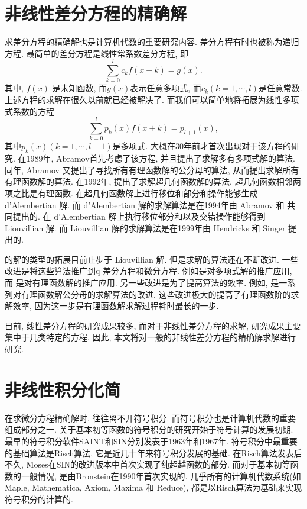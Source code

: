 \section{非线性差分方程的精确解}
求差分方程的精确解也是计算机代数的重要研究内容. 差分方程有时也被称为递归方程. 最简单的差分方程是线性常系数差分方程, 即
\begin{equation}
\sum_{k=0}^l{c_k f(x+k)}=g(x).
\label{ceq}
\end{equation}
其中, $f(x)$ 是未知函数, 而$g(x)$表示任意多项式, 而$c_k (k=1,\cdots,l)$是任意常数. 上述方程的求解在很久以前就已经被解决了. 而我们可以简单地将拓展为线性多项式系数的方程
\begin{equation}
\sum_{k=0}^l{p_k(x)f(x+k)=p_{l+1}(x)},
\label{peq}
\end{equation}
其中$p_k(x) (k=1,\cdots,l+1)$是多项式. 大概在30年前才首次出现对于该方程的研究. 在1989年, Abramov首先考虑了该方程, 并且提出了求解多有多项式解的算法\citep{Abramov1989polynomial}. 同年, Abramov 又提出了寻找所有有理函数解的公分母的算法, 从而提出求解所有有理函数解的算法\citep{Abramov1989rational}. 在1992年, \Petkovsek{} 提出了求解超几何函数解的算法\citep{petkovvsek1992hypergeometric}. 超几何函数相邻两项之比是有理函数. 在超几何函数解上进行移位和部分和操作能够生成 d'Alembertian 解. 而 d'Alembertian 解的求解算法是在1994年由 Abramov 和 \Petkovsek{} 共同提出的\citep{abramov1994dAlembertian}. 在 d'Alembertian 解上执行移位\D 部分和以及交错操作能够得到 Liouvillian 解. 而 Liouvillian 解的求解算法是在1999年由 Hendricks 和 Singer 提出的\citep{hendricks1999Liouvillian}.

的解的类型的拓展目前止步于 Liouvillian 解. 但是求解的算法还在不断改进. 一些改进是将这些算法推广到q-差分方程和微分方程. 例如是对多项式解的推广应用, 而 是对有理函数解的推广应用. 另一些改进是为了提高算法的效率. 例如,  是一系列对有理函数解公分母的求解算法的改进. 这些改进极大的提高了有理函数阶的求解效率, 因为这一步是有理函数解求解过程耗时最长的一步. 

目前, 线性差分方程的研究成果较多, 而对于非线性差分方程的求解, 研究成果主要集中于几类特定的方程\cite{chen2011some,ishizaki2011difference}. 因此, 本文将对一般的非线性差分方程的精确解求解进行研究. 

\section{非线性积分化简}
在求微分方程精确解时, 往往离不开符号积分. 而符号积分也是计算机代数的重要组成部分之一. 关于基本初等函数的符号积分的研究开始于符号计算的发展初期. 最早的符号积分软件SAINT和SIN分别发表于1963年\citep{slagle1963}和1967年\citep{moses1967}. 符号积分中最重要的基础算法是Risch算法\citep{risch1969,risch1970}, 它是近几十年来符号积分发展的基础. 在Risch算法发表后不久, Moses在SIN的改进版本中首次实现了纯超越函数的部分\citep{moses1971}. 而对于基本初等函数的一般情况, 是由Bronstein在1990年首次实现的\citep{bronstein1990}. 几乎所有的计算机代数系统(如 Maple, Mathematica, Axiom, Maxima 和 Reduce), 都是以Risch算法为基础来实现符号积分的计算的. 

